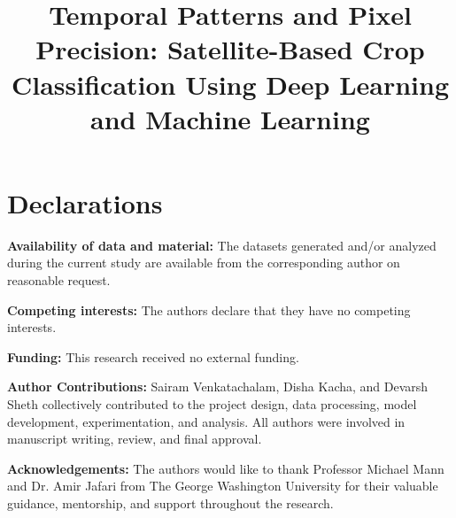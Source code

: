 \documentclass[pdflatex,sn-mathphys]{sn-jnl} %
\begin{document}
\title[Satellite Crop Classification]{Temporal Patterns and Pixel Precision: Satellite-Based Crop Classification Using Deep Learning and Machine Learning}
\makeatletter
\renewcommand{\@makefnmark}{\textsuperscript{*}}
\renewcommand{\footnoterule}{
  \kern -3pt
  \hrule width 2cm height 0.4pt
  \kern 2.6pt
}
\makeatother
{}
\author[1]{ }
\author[1]{ }
\author[1]{ }
\author[2]{ }
\author[2]{ }

\maketitle
\section*{Declarations}

\textbf{Availability of data and material:} The datasets generated and/or analyzed during the current study are available from the corresponding author on reasonable request.

\noindent\textbf{Competing interests:} The authors declare that they have no competing interests.

\noindent\textbf{Funding:} This research received no external funding.

\noindent\textbf{Author Contributions:} Sairam Venkatachalam, Disha Kacha, and Devarsh Sheth collectively contributed to the project design, data processing, model development, experimentation, and analysis. All authors were involved in manuscript writing, review, and final approval.

\noindent\textbf{Acknowledgements:} The authors would like to thank Professor Michael Mann and Dr. Amir Jafari from The George Washington University for their valuable guidance, mentorship, and support throughout the research.\\
\end{document}
